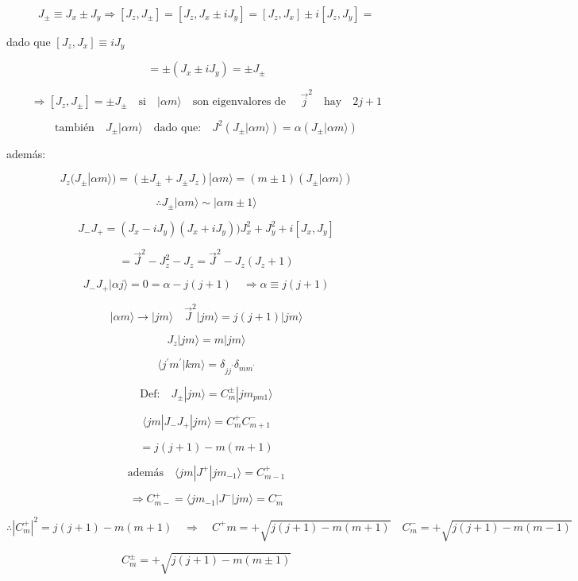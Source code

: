 \documentclass{report}
\begin{document}
\[J_{\pm}\equiv J_x \pm J_y \Rightarrow [J_z, J_{\pm}] = [J_z , J_x \pm i J_y] = [J_{z},J_{x}] \pm i [J_{z},J_y ] = \]

dado que $[J_ z , J_x ] \equiv i J_y$

\[= \pm (J_x \pm i J_y ) = \pm J_{\pm}\]

\[\Rightarrow [J_z , J_{\pm}] = \pm J_{\pm} \quad \text{si} \quad |\alpha m \rangle \quad \text{son eigenvalores de } \quad \overrightarrow{j}^2 \quad \text{hay} \quad 2j+1\]

\[\text{también} \quad J_{\pm} |\alpha m \rangle \quad \text{dado que:} \quad J^2 (J_{\pm} |\alpha m \rangle) = \alpha(J_{\pm}|\alpha m \rangle )\]

además:

\[J_z (J_{\pm} | \alpha m \rangle ) = (\pm J_{\pm} + J_{\pm} J_z ) |\alpha m \rangle = (m \pm 1) (J_{\pm} |\alpha m \rangle)\]

\[\therefore J_{\pm} | \alpha m \rangle \sim |\alpha m \pm 1 \rangle \]

\[J_{-} J_{+} = (J_x -i J_y ) (J_x + i J_y ) ) J_{x}^{2} + J_{y}^{2} + i [J_x , J_y ]\]

\[= \overrightarrow{J}^2 - J_{z}^{2} - J_z = \overrightarrow{J}^2 - J_z (J_z +1)\]

\[J_{-} J_{+} | \alpha j \rangle = 0 = \alpha - j (j+1) \quad \Rightarrow \alpha \equiv j(j+1)\]

\[|\alpha m \rangle \rightarrow |j m \rangle \quad \overrightarrow{J}^2 | jm \rangle = j(j+1) |jm \rangle\]

\[J_{z} |jm \rangle = m | jm \rangle\]

\[\langle j^{\prime} m^{\prime} | k m \rangle = \delta_{j j^{\prime}} \delta_{m m^{\prime}}\]

\[\text{Def:} \quad J_{\pm} | jm \rangle = C^{\pm} _{m} | j m_{pm 1}\rangle\]

\[\langle jm | J_{-}J_{+} | jm \rangle = C_{m}^{+} C^{-}_{m+1}\]

\[= j (j+1) - m (m+1)\]

\[\text{además} \quad \langle jm | J^{+} | j m_{-1}\rangle = C^{+}_{m-1}\]

\[\Rightarrow C^{+}_{m-} = \langle jm_{-1} | J^{-}| jm \rangle = C^{-}_{m}\]

\[\therefore |C^{+}_{m}|^2 = j (j+1)-m(m+1) \quad \Rightarrow \quad C^{+}{m} = + \sqrt{j(j+1)-m(m+1)} \quad C^{-}_{m} = + \sqrt{j(j+1)-m(m-1)}\]

\begin{equation}
C^{\pm}_{m} = + \sqrt{j(j+1) - m(m\pm 1)}
\end{equation}
\end{document}
